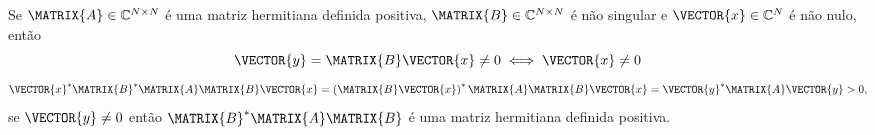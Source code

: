 \begin{myproofT}\label{proof:theo:prophermitianpositivematrix1:b}
Se $\MATRIX{A} \in \mathbb{C}^{N \times N}$ é uma matriz hermitiana definida positiva, 
$\MATRIX{B} \in \mathbb{C}^{N \times N}$ é não singular e
$\VECTOR{x} \in \mathbb{C}^{N}$ é não nulo, então
\begin{equation}
\VECTOR{y}=\MATRIX{B}\VECTOR{x}\neq 0 \iff \VECTOR{x}\neq 0
\end{equation}
\begin{equation}
\VECTOR{x}^{\ast} \MATRIX{B}^{\ast} \MATRIX{A} \MATRIX{B} \VECTOR{x} =
\left(\MATRIX{B}\VECTOR{x}\right)^{\ast} \MATRIX{A} \MATRIX{B} \VECTOR{x} =
\VECTOR{y}^{\ast} \MATRIX{A} \VECTOR{y}>0,
\end{equation}
se $\VECTOR{y}\neq 0$ então $\MATRIX{B}^{\ast} \MATRIX{A} \MATRIX{B}$
é uma matriz hermitiana definida positiva.
\end{myproofT}


